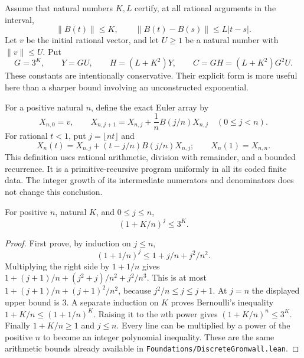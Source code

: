 Assume that natural numbers $K,L$ certify, at all rational arguments in the
interval,
\begin{equation}\label{eq:ode-KL}
 \lVert B(t)\rVert\le K,\qquad
 \lVert B(t)-B(s)\rVert\le L|t-s|.
\end{equation}
Let $v$ be the initial rational vector, and let $U\ge1$ be a natural number
with $\lVert v\rVert\le U$. Put
\begin{equation}\label{eq:ode-constants}
 G=3^K,\qquad Y=GU,\qquad
 H=(L+K^2)Y,\qquad C=GH=(L+K^2)G^2U.
\end{equation}
These constants are intentionally conservative. Their explicit form is more
useful here than a sharper bound involving an unconstructed exponential.

For a positive natural $n$, define the exact Euler array by
\begin{equation}\label{eq:exact-euler}
 X_{n,0}=v,\qquad
 X_{n,j+1}=X_{n,j}+\frac1n B(j/n)X_{n,j}
 \quad(0\le j<n).
\end{equation}
For rational $t<1$, put $j=\lfloor nt\rfloor$ and
\[
 X_n(t)=X_{n,j}+(t-j/n)B(j/n)X_{n,j};
 \qquad X_n(1)=X_{n,n}.
\]
This definition uses rational arithmetic, division with remainder, and a
bounded recurrence. It is a primitive-recursive program uniformly in all
its coded finite data. The integer growth of its intermediate numerators
and denominators does not change this conclusion.

\begin{lemma}\label{lem:ode-growth}
For positive $n$, natural $K$, and $0\le j\le n$,
\[
 (1+K/n)^j\le3^K.
\]
\end{lemma}
\begin{proof}
First prove, by induction on $j\le n$,
\[
 (1+1/n)^j\le 1+j/n+j^2/n^2.
\]
Multiplying the right side by $1+1/n$ gives
$1+(j+1)/n+(j^2+j)/n^2+j^2/n^3$.
This is at most $1+(j+1)/n+(j+1)^2/n^2$, because
$j^2/n\le j\le j+1$. At $j=n$ the displayed upper bound is $3$.
A separate induction on $K$ proves Bernoulli's inequality
$1+K/n\le(1+1/n)^K$. Raising it to the $n$th power gives
$(1+K/n)^n\le3^K$. Finally $1+K/n\ge1$ and $j\le n$.
Every line can be multiplied by a power of the positive $n$ to become
an integer polynomial inequality. These are the same arithmetic bounds
already available in \nolinkurl{Foundations/DiscreteGronwall.lean}.
\end{proof}

